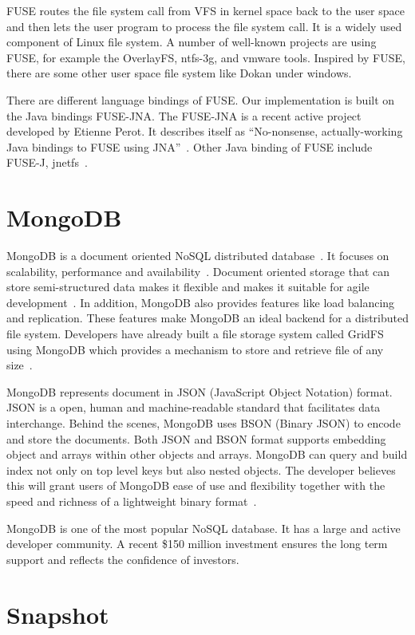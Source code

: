     FUSE routes the file system call from VFS in kernel space back to the user space and then lets the user program to process the file system call. It is a widely used component of Linux file system. A number of well-known projects are using FUSE, for example the OverlayFS, ntfs-3g, and vmware tools. Inspired by FUSE, there are some other user space file system like Dokan under windows.

    There are different language bindings of FUSE. Our implementation is built on the Java bindings FUSE-JNA. The FUSE-JNA is a recent active project developed by Etienne Perot. It describes itself as ``No-nonsense, actually-working Java bindings to FUSE using JNA''~\cite{fusejna}. Other Java binding of FUSE include FUSE-J, jnetfs~\cite{jnetfs}.

\section{MongoDB}

    MongoDB is a document oriented NoSQL distributed database~\cite{mongo_overview}. It focuses on scalability, performance and availability~\cite{mongo_overview}. Document oriented storage that can store semi-structured data makes it flexible and makes it suitable for agile development~\cite{docdb}. In addition, MongoDB also provides features like load balancing and replication. These features make MongoDB an ideal backend for a distributed file system. Developers have already built a file storage system called GridFS using MongoDB which provides a mechanism to store and retrieve file of any size~\cite{gridfs}.

    MongoDB represents document in JSON (JavaScript Object Notation) format. JSON is a open, human and machine-readable standard that facilitates data interchange. Behind the scenes, MongoDB uses BSON (Binary JSON) to encode and store the documents. Both JSON and BSON format supports embedding object and arrays within other objects and arrays. MongoDB can query and build index not only on top level keys but also nested objects. The developer believes this will grant users of MongoDB ease of use and flexibility together with the speed and richness of a lightweight binary format~\cite{bson}.

    MongoDB is one of the most popular NoSQL database. It has a large and active developer community. A recent \$150 million investment ensures the long term support and reflects the confidence of investors.

\section{Snapshot}


